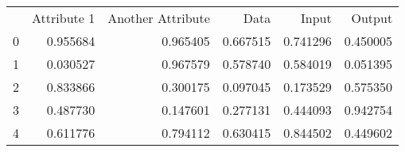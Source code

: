 \begin{tabular}{lrrrrr}
 & Attribute 1 & Another Attribute & Data & Input & Output \\
0 & 0.955684 & 0.965405 & 0.667515 & 0.741296 & 0.450005 \\
1 & 0.030527 & 0.967579 & 0.578740 & 0.584019 & 0.051395 \\
2 & 0.833866 & 0.300175 & 0.097045 & 0.173529 & 0.575350 \\
3 & 0.487730 & 0.147601 & 0.277131 & 0.444093 & 0.942754 \\
4 & 0.611776 & 0.794112 & 0.630415 & 0.844502 & 0.449602 \\
\end{tabular}
